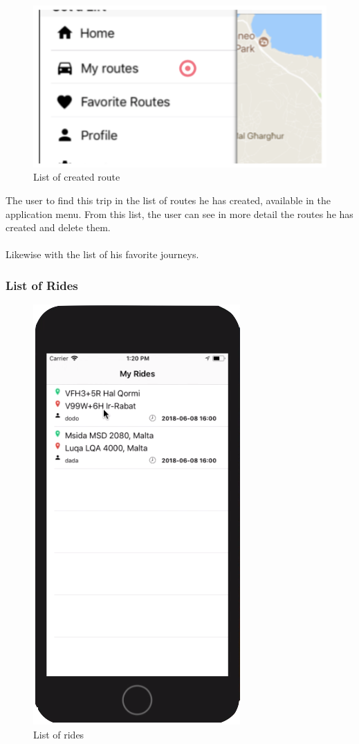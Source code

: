\begin{figure}[h!]
\begin{center}
\includegraphics[scale = 0.3]{diagrams/ListCreatedRoute.png} 
\end{center}
\caption{List of created route}
\end{figure}

The user to find this trip in the list of routes he has created, available in the application menu. From this list, the user can see in more detail the routes he has created and delete them.
\\\\
Likewise with the list of his favorite journeys.

\newpage

\subsubsection{List of Rides}

\begin{figure}[h!]
\begin{center}
\includegraphics[scale = 0.3]{diagrams/MyRides.png} 
\end{center}
\caption{List of rides}
\end{figure}

